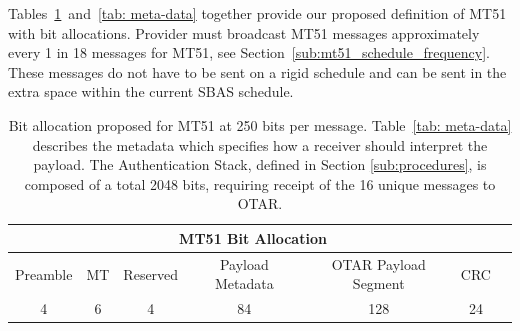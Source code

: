 \documentclass[APA,STIX1COL]{IONjournal/ION-APA Template}
\begin{document}
		Tables~\ref{tab: mt51-b}~and~\ref{tab: meta-data} together provide our proposed definition of MT51 with bit allocations.
		Provider must broadcast MT51 messages approximately every 1 in 18 messages for MT51, see Section~\ref{sub:mt51_schedule_frequency}.
		These messages do not have to be sent on a rigid schedule and can be sent in the extra space within the current SBAS schedule.

		\begin{table}%
			\center
			\begin{tabular}{|c|c|c|c|c|c|c|} \hline
				\multicolumn{6}{|c|}{MT51 Bit Allocation} \\ \hline
				Preamble & MT & Reserved & Payload Metadata & OTAR Payload Segment & CRC \\ \hline
				4 & 6 & 4 & 84 & 128 & 24 \\ \hline
			\end{tabular}
			\caption{
				Bit allocation proposed for MT51 at 250 bits per message. 
				Table~\ref{tab: meta-data} describes the metadata which specifies how a receiver should interpret the payload.
				The Authentication Stack, defined in Section \ref{sub:procedures}, is composed of a total 2048 bits, requiring receipt of the 16 unique messages to OTAR.
			}
			\label{tab: mt51-b}
		\end{table}
\end{document}
